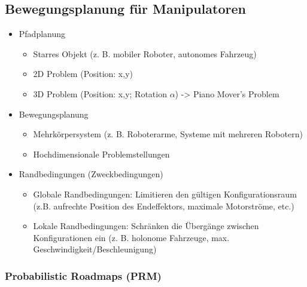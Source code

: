\documentclass[paper=a4, fontsize=11pt]{scrartcl} %
\numberwithin{equation}{section} %
\numberwithin{figure}{section} %
\numberwithin{table}{section} %
\begin{document}
\subsection{Bewegungsplanung für Manipulatoren}

\begin{itemize}
\item Pfadplanung
\begin{itemize}
\item Starres Objekt (z. B. mobiler Roboter, autonomes Fahrzeug)
\item 2D Problem (Position: x,y)
\item 3D Problem (Position: x,y; Rotation $\alpha$) -> Piano Mover's Problem
\end{itemize}
\item Bewegungsplanung
\begin{itemize}
\item Mehrkörpersystem (z. B. Roboterarme, Systeme mit mehreren Robotern)
\item Hochdimensionale Problemstellungen
\end{itemize}
\item Randbedingungen (Zweckbedingungen)
\begin{itemize}
\item Globale Randbedingungen: Limitieren den gültigen Konfigurationsraum (z.B. aufrechte Position des Endeffektors, maximale Motorströme, etc.)
\item Lokale Randbedingungen: Schränken die Übergänge zwischen Konfigurationen ein (z. B. holonome Fahrzeuge, max. Geschwindigkeit/Beschleunigung)
\end{itemize}
\end{itemize}

\subsubsection{Probabilistic Roadmaps (PRM)}
\end{document}
